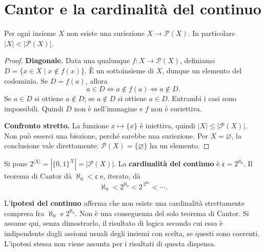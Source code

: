 \section{Cantor e la cardinalità del continuo}
\begin{teorema}[Cantor]\label{teo:cantor}
Per ogni insieme $X$ non esiste una suriezione $X\to\mathcal P(X)$. In particolare $|X|<|\mathcal P(X)|$.
\end{teorema}
\begin{proof}
\textbf{Diagonale.} Data una qualunque $f:X\to\mathcal P(X)$, definiamo $D=\{x\in X\mid x\notin f(x)\}$. È un sottoinsieme di $X$, dunque un elemento del codominio. Se $D=f(a)$, allora
\[
a\in D\iff a\notin f(a)\iff a\notin D.
\]
Se $a\in D$ si ottiene $a\notin D$; se $a\notin D$ si ottiene $a\in D$. Entrambi i casi sono impossibili. Quindi $D$ non è nell'immagine e $f$ non è suriettiva.

\textbf{Confronto stretto.} La funzione $x\mapsto\{x\}$ è iniettiva, quindi $|X|\le|\mathcal P(X)|$. Non può esserci una biezione, perché sarebbe una suriezione. Per $X=\varnothing$, la conclusione vale direttamente: $\mathcal P(X)=\{\varnothing\}$ ha un elemento.
\end{proof}

\begin{definizione}
Si pone $2^{|X|}=|\{0,1\}^X|=|\mathcal P(X)|$. La \textbf{cardinalità del continuo} è $\mathfrak c=2^{\aleph_0}$. Il teorema di Cantor dà $\aleph_0<\mathfrak c$ e, iterato, dà
\[
\aleph_0<2^{\aleph_0}<2^{\,2^{\aleph_0}}<\cdots.
\]
\end{definizione}

\begin{osservazione}
L'\textbf{ipotesi del continuo} afferma che non esiste una cardinalità strettamente compresa fra $\aleph_0$ e $2^{\aleph_0}$. Non è una conseguenza del solo teorema di Cantor. Si assume qui, senza dimostrarlo, il risultato di logica secondo cui essa è indipendente dagli assiomi usuali degli insiemi con scelta, se questi sono coerenti. L'ipotesi stessa non viene assunta per i risultati di questa dispensa.
\end{osservazione}

